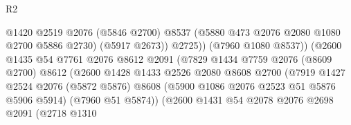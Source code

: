 \begin{lexlean}{R2}
\begin{coremodule}
                                                  @1420
                                                  @2519
                                                  @2076
                                                  (@5846 @2700)
                                                  @8537
                                                  (@5880 @473 @2076 @2080 @1080 @2700 @5886 @2730)
                                                  (@5917 @2673))
                                                @2725))
                                            (@7960 @1080 @8537))
                                          (@2600
                                            @1435
                                            @54
                                            @7761
                                            @2076
                                            @8612
                                            @2091
                                            (@7829
                                              @1434
                                              @7759
                                              @2076
                                              (@8609 @2700)
                                              @8612
                                              (@2600
                                                @1428
                                                @1433
                                                @2526
                                                @2080
                                                @8608
                                                @2700
                                                (@7919
                                                  @1427
                                                  @2524
                                                  @2076
                                                  (@5872 @5876)
                                                  @8608
                                                  (@5900 @1086 @2076 @2523 @51 @5876 @5906 @5914)
                                                  (@7960 @51 @5874))
                                                (@2600
                                                  @1431
                                                  @54
                                                  @2078
                                                  @2076
                                                  @2698
                                                  @2091
                                                  (@2718
                                                    @1310

\end{coremodule}
\end{lexlean}
